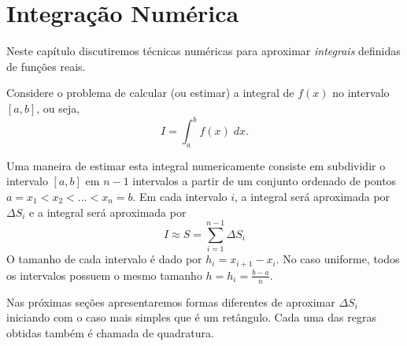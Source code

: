 
%

\chapter{Integração Numérica}

Neste capítulo discutiremos técnicas numéricas para aproximar \emph{integrais} definidas de funções reais.

Considere o problema de calcular (ou estimar) a integral de $f(x)$ no intervalo $[a,b]$, ou seja,
$$
 I = \int_a^b f(x) \;dx.
$$

Uma maneira de estimar esta integral numericamente consiste em subdividir o intervalo $[a,b]$ em $n-1$ intervalos a partir de um conjunto ordenado de pontos $a=x_1<x_2<...<x_n=b$. 
Em cada intervalo $i$, a integral será aproximada por $\Delta S_i$ e a integral será aproximada por 
$$
 I \approx S = \sum_{i=1}^{n-1} \Delta S_i
$$
O tamanho de cada intervalo é dado por $h_i=x_{i+1}-x_i$. No caso uniforme, todos os intervalos possuem o mesmo tamanho $h=h_i=\frac{b-a}{n}$.

Nas próximas seções apresentaremos formas diferentes de aproximar $\Delta S_i$ iniciando com o caso mais simples que é um retângulo. Cada uma das regras obtidas também é chamada de quadratura.

